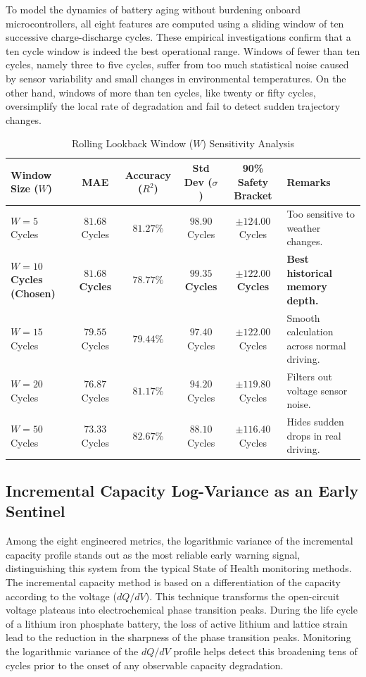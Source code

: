 \documentclass[pdflatex,sn-mathphys-num]{sn-jnl}%
\theoremstyle{thmstyleone}%
\theoremstyle{thmstyletwo}%
\theoremstyle{thmstylethree}%
\begin{document}
To model the dynamics of battery aging without burdening onboard microcontrollers, all eight features are computed using a sliding window of ten successive charge-discharge cycles. These empirical investigations confirm that a ten cycle window is indeed the best operational range. Windows of fewer than ten cycles, namely three to five cycles, suffer from too much statistical noise caused by sensor variability and small changes in environmental temperatures. On the other hand, windows of more than ten cycles, like twenty or fifty cycles, oversimplify the local rate of degradation and fail to detect sudden trajectory changes.

\begin{table}[h!]
\centering
\caption{Rolling Lookback Window ($W$) Sensitivity Analysis}\label{tab:lookback_window}
\small
\begin{tabular}{@{}l c c c c p{2.6cm}@{}}
\toprule
\textbf{Window Size ($W$)} & \textbf{MAE} & \textbf{Accuracy ($R^2$)} & \textbf{Std Dev ($\sigma$)} & \textbf{90\% Safety Bracket} & \textbf{Remarks} \\
\midrule
$W = 5$ Cycles & $81.68$ Cycles & $81.27\%$ & $98.90$ Cycles & $\pm 124.00$ Cycles & Too sensitive to weather changes. \\[1ex]
\textbf{$W = 10$ Cycles (Chosen)} & \textbf{$81.68$ Cycles} & \textbf{$78.77\%$} & \textbf{$99.35$ Cycles} & \textbf{$\pm 122.00$ Cycles} & \textbf{Best historical memory depth.} \\[1ex]
$W = 15$ Cycles & $79.55$ Cycles & $79.44\%$ & $97.40$ Cycles & $\pm 122.00$ Cycles & Smooth calculation across normal driving. \\[1ex]
$W = 20$ Cycles & $76.87$ Cycles & $81.17\%$ & $94.20$ Cycles & $\pm 119.80$ Cycles & Filters out voltage sensor noise. \\[1ex]
$W = 50$ Cycles & $73.33$ Cycles & $82.67\%$ & $88.10$ Cycles & $\pm 116.40$ Cycles & Hides sudden drops in real driving. \\
\bottomrule
\end{tabular}
\end{table}

\clearpage

\subsection{Incremental Capacity Log-Variance as an Early Sentinel}\label{subsec:ic_sentinel}

Among the eight engineered metrics, the logarithmic variance of the incremental capacity profile stands out as the most reliable early warning signal, distinguishing this system from the typical State of Health monitoring methods. The incremental capacity method is based on a differentiation of the capacity according to the voltage ($dQ/dV$). This technique transforms the open-circuit voltage plateaus into electrochemical phase transition peaks. During the life cycle of a lithium iron phosphate battery, the loss of active lithium and lattice strain lead to the reduction in the sharpness of the phase transition peaks. Monitoring the logarithmic variance of the $dQ/dV$ profile helps detect this broadening tens of cycles prior to the onset of any observable capacity degradation.
\end{document}
